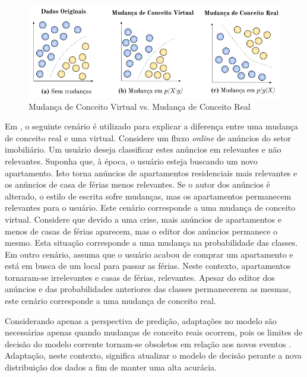 \documentclass[qual, classic, a4paper]{ufbathesis}
\begin{document}
\begin{figure}[!ht]
\begin{center}
    \includegraphics[scale=0.8]{imagens/concept_drift.png}
    \caption{Mudança de Conceito Virtual vs. Mudança de Conceito Real}
    \label{fig:real_and_virtual_concept_drift}
\end{center}
\end{figure}

Em \cite{Gama:2014:SCD:2597757.2523813}, o seguinte cenário é utilizado para explicar a diferença entre uma mudança de conceito real e uma virtual.
Considere um fluxo \textit{online} de anúncios do setor imobiliário.
Um usuário deseja classificar estes anúncios em relevantes e não relevantes.
Suponha que, à época, o usuário esteja buscando um novo apartamento. 
Isto torna anúncios de apartamentos residenciais mais relevantes e os anúncios de casa de férias menos relevantes.
Se o autor dos anúncios é alterado, o estilo de escrita sofre mudanças, mas os apartamentos permanecem relevantes para o usuário.
Este cenário corresponde a uma mudança de conceito virtual.
Considere que devido a uma crise, mais anúncios de apartamentos e menos de casas de férias aparecem, mas o editor dos anúncios permanece o mesmo.
Esta situação corresponde a uma mudança na probabilidade das classes.
Em outro cenário, assuma que o usuário acabou de comprar um apartamento e está em busca de um local para passar as férias.
Neste contexto, apartamentos tornaram-se irrelevantes e casas de férias, relevantes.
Apesar do editor dos anúncios e das probabilidades anteriores das classes permanecerem as mesmas, este cenário corresponde a uma mudança de conceito real.

Considerando apenas a perspectiva de predição, adaptações no modelo são necessárias apenas quando mudanças de conceito reais ocorrem, 
pois os limites de decisão do modelo corrente tornam-se obsoletos em relação aos novos eventos \cite{Gama:2014:SCD:2597757.2523813}.
Adaptação, neste contexto, significa atualizar o modelo de decisão perante a nova distribuição dos dados a fim de manter uma alta acurácia.
\end{document}
